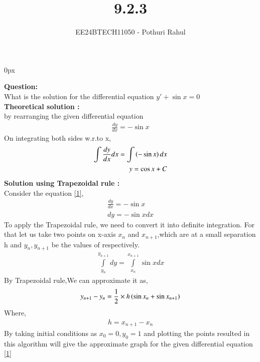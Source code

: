 \documentclass[journal]{IEEEtran}
\begin{document}

\vspace{3cm}
\parindent 0px

\title{9.2.3}
\author{EE24BTECH11050 - Pothuri Rahul}
{\let\newpage\relax\maketitle}

\renewcommand{\thefigure}{\theenumi}
\renewcommand{\thetable}{\theenumi}
\setlength{\intextsep}{10pt} %


\renewcommand{\thetable}{\theenumi}

\textbf{Question:} \\
What is the solution for the differential equation $y'+\sin{x}=0$
\solution \\
\textbf{Theoretical solution :} \\
by rearranging the given differential equation \\
\begin{align}
\frac{dy}{dx} = - \sin{x} \label{1}
\end{align}
On integrating both sides w.r.to x,
\begin{align}
\int \frac{dy}{dx} dx = \int \left(- \sin{x}\right) dx \\
y = \cos{x}+C
\end{align}
\textbf{Solution using Trapezoidal rule :} \\
Consider the equation \eqref{1},
\begin{align}
\frac{dy}{dx} = - \sin{x} \\
dy = -\sin{x}dx
\end{align}
To apply the Trapezoidal rule, we need to convert it into definite integration. For that let us take two points on x-axis $x_n$ and $x_{n+1}$,which are at a small separation h and $y_n , y_{n+1}$ be the values of respectively. \\
\begin{align}
\int\limits_{y_n} ^{y_{n+1}} dy = \int\limits_{x_n} ^{x_{n+1}} \sin{x} dx
\end{align}
By Trapezoidal rule,We can approximate it as,
\begin{align}
y_{n+1}-y_n = \frac{1}{2} \times h \left( \sin{x_n}+\sin{x_{n+1}}\right)
\end{align}
Where,
\begin{align}
h = x_{n+1} - x_n
\end{align}
By taking initial conditions as $x_0 = 0,y_0 = 1$ and plotting the points resulted in this algorithm will give the approximate graph for the given differential equation \eqref{1} 
\end{document}
